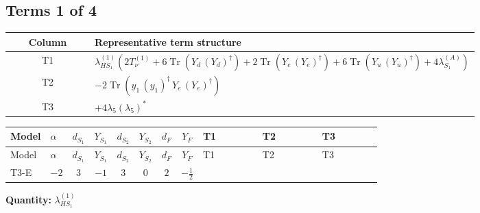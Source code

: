\documentclass[8pt]{article}
\begin{document}
\begin{landscape}
\subsection*{Terms 1 of 4}
\begin{center}
\begin{tabular}{@{}c >{\raggedright\arraybackslash}p{0.82\linewidth}@{}}
\toprule
Column & Representative term structure \\
\midrule
T1 & \(\displaystyle {\lambda_{HS_1}^{(1)}} (2 T_{\nu}^{(1)}+6 \operatorname{Tr}\!\left({Y_d}\,\left({Y_d}\right)^{\dagger}\right)+2 \operatorname{Tr}\!\left({Y_e}\,\left({Y_e}\right)^{\dagger}\right)+6 \operatorname{Tr}\!\left({Y_u}\,\left({Y_u}\right)^{\dagger}\right)+4 {\lambda_{S_1}^{(A)}})\) \\
\midrule
T2 & \(\displaystyle -2 \operatorname{Tr}\!\left({y_1}\,\left({y_1}\right)^{\dagger}\,{Y_e}\,\left({Y_e}\right)^{\dagger}\right)\) \\
\midrule
T3 & \(\displaystyle +4 {\lambda_5} \left({\lambda_5}\right)^{*}\) \\
\midrule
\bottomrule
\end{tabular}
\end{center}
\smallskip
\tiny
\begin{longtable}{@{}llcccccc >{\raggedright\arraybackslash}p{0.21\linewidth} >{\raggedright\arraybackslash}p{0.21\linewidth} >{\raggedright\arraybackslash}p{0.21\linewidth}@{}}
\toprule
Model & $\alpha$ & $d_{S_1}$ & $Y_{S_1}$ & $d_{S_2}$ & $Y_{S_2}$ & $d_F$ & $Y_F$ & T1 & T2 & T3 \\
\midrule
\endfirsthead
\toprule
Model & $\alpha$ & $d_{S_1}$ & $Y_{S_1}$ & $d_{S_2}$ & $Y_{S_2}$ & $d_F$ & $Y_F$ & T1 & T2 & T3 \\
\midrule
\endhead
T3-E & $-2$ & $3$ & $-1$ & $3$ & $0$ & $2$ & $-\frac{1}{2}$ & \scriptsize\adjustbox{max width=\linewidth}{$\begin{gathered} {\lambda_{HS_1}^{(1)}} (2 T_{\nu}^{(1)}+6 \operatorname{Tr}\!\left({Y_d}\,\left({Y_d}\right)^{\dagger}\right)+2 \operatorname{Tr}\!\left({Y_e}\,\left({Y_e}\right)^{\dagger}\right)+6 \operatorname{Tr}\!\left({Y_u}\,\left({Y_u}\right)^{\dagger}\right)+4 {\lambda_{S_1}^{(A)}})\end{gathered}$} & \scriptsize\adjustbox{max width=\linewidth}{$\begin{gathered} -2 \operatorname{Tr}\!\left({y_1}\,\left({y_1}\right)^{\dagger}\,{Y_e}\,\left({Y_e}\right)^{\dagger}\right)\end{gathered}$} & \scriptsize\adjustbox{max width=\linewidth}{$\begin{gathered} +4 {\lambda_5} \left({\lambda_5}\right)^{*}\end{gathered}$} \\
\midrule
\bottomrule
\end{longtable}
\clearpage
\noindent\textbf{Quantity: }$\lambda_{HS_1}^{(1)}$\par\smallskip

\end{landscape}
\end{document}
